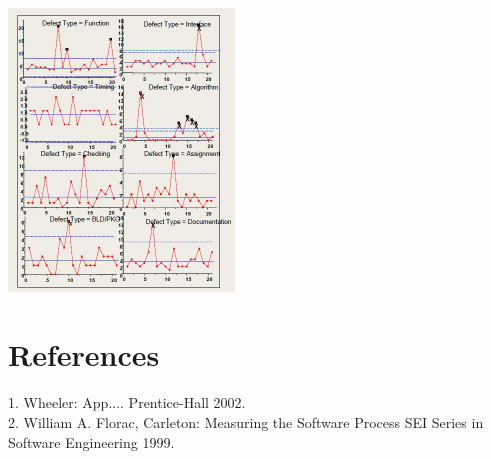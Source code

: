 \includegraphics[width=6cm]{DAD_p67.jpg}


\hypertarget{ux9644ux4ef6}{%
\section{References}\label{ux9644ux4ef6}}


1. Wheeler: App.... Prentice-Hall 2002.\\
2. William A. Florac, Carleton: Measuring the Software Process SEI Series in Software Engineering 1999.\\
